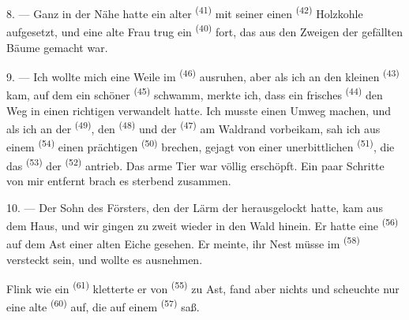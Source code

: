 8. --- Ganz in der Nähe hatte ein alter  \textsuperscript{(41)} mit
seiner  einen  \textsuperscript{(42)} Holzkohle
aufgesetzt, und eine alte Frau trug ein  \textsuperscript{(40)}
 fort, das aus den Zweigen der gefällten Bäume gemacht war.

\VUsaut{3.0mm}
\VUsaut{3.0mm}

9. --- Ich wollte mich eine Weile im  \textsuperscript{(46)}
ausruhen, aber als ich an den kleinen  \textsuperscript{(43)} kam, auf
dem ein schöner  \textsuperscript{(45)} schwamm, merkte ich, dass ein
frisches  \textsuperscript{(44)} den Weg in einen richtigen
 verwandelt hatte. Ich musste einen Umweg machen, und als ich an der
 \textsuperscript{(49)}, den  \textsuperscript{(48)} und
der  \textsuperscript{(47)} am Waldrand vorbeikam, sah ich aus einem
 \textsuperscript{(54)} einen prächtigen 
\textsuperscript{(50)} brechen, gejagt von einer unerbittlichen 
\textsuperscript{(51)}, die das  \textsuperscript{(53)} der
 \textsuperscript{(52)} antrieb. Das arme Tier war völlig
erschöpft. Ein paar Schritte von mir entfernt brach es sterbend zusammen.

10. --- Der Sohn des Försters, den der Lärm der  herausgelockt hatte,
kam aus dem Haus, und wir gingen zu zweit wieder in den Wald hinein. Er hatte eine
 \textsuperscript{(56)} auf dem Ast einer alten Eiche gesehen. Er
meinte, ihr Nest müsse im  \textsuperscript{(58)} versteckt sein, und
wollte es ausnehmen.

Flink wie ein  \textsuperscript{(61)} kletterte er von
 \textsuperscript{(55)} zu Ast, fand aber nichts und scheuchte nur eine
alte  \textsuperscript{(60)} auf, die auf einem 
\textsuperscript{(57)} saß.
\VUsaut{4.0mm}
\VUfilet{22mm}
